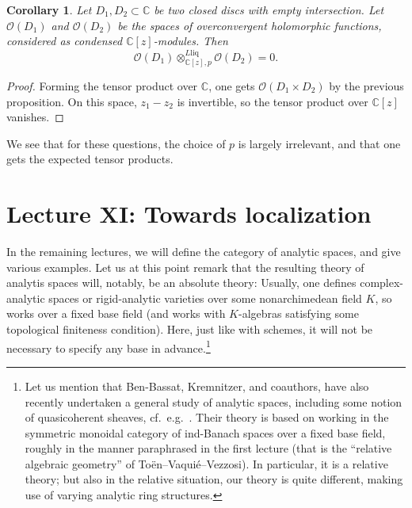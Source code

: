 \documentclass[11pt]{amsbook}
\numberwithin{equation}{section}
\numberwithin{theorem}{section}
\newtheorem{corollary}[theorem]{Corollary}
\theoremstyle{definition}
\begin{document}
\begin{corollary} Let $D_1,D_2\subset \mathbb C$ be two closed discs with empty intersection. Let $\mathcal O(D_1)$ and $\mathcal O(D_2)$ be the spaces of overconvergent holomorphic functions, considered as condensed $\mathbb C[z]$-modules. Then
\[
\mathcal O(D_1)\otimes^{L\mathrm{liq}}_{\mathbb C[z],p} \mathcal O(D_2) = 0.
\]
\end{corollary}

\begin{proof} Forming the tensor product over $\mathbb C$, one gets $\mathcal O(D_1\times D_2)$ by the previous proposition. On this space, $z_1-z_2$ is invertible, so the tensor product over $\mathbb C[z]$ vanishes.
\end{proof}

We see that for these questions, the choice of $p$ is largely irrelevant, and that one gets the expected tensor products.

\newpage

\section{Lecture XI: Towards localization}

In the remaining lectures, we will define the category of analytic spaces, and give various examples. Let us at this point remark that the resulting theory of analytis spaces will, notably, be an absolute theory: Usually, one defines complex-analytic spaces or rigid-analytic varieties over some nonarchimedean field $K$, so works over a fixed base field (and works with $K$-algebras satisfying some topological finiteness condition). Here, just like with schemes, it will not be necessary to specify any base in advance.\footnote{Let us mention that Ben-Bassat, Kremnitzer, and coauthors, have also recently undertaken a general study of analytic spaces, including some notion of quasicoherent sheaves, cf.~e.g.~\cite{BenBassatKremnizer}. Their theory is based on working in the symmetric monoidal category of ind-Banach spaces over a fixed base field, roughly in the manner paraphrased in the first lecture (that is the ``relative algebraic geometry'' of To\"en--Vaqui\'e--Vezzosi). In particular, it is a relative theory; but also in the relative situation, our theory is quite different, making use of varying analytic ring structures.}
\end{document}
